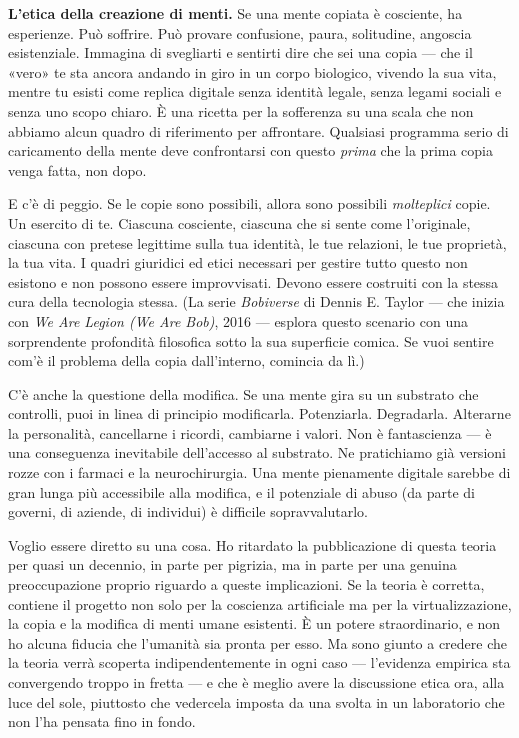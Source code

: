 \documentclass[11pt, twoside, openright]{book}
\begin{document}
\textbf{L'etica della creazione di menti.} Se una mente copiata è cosciente, ha esperienze. Può soffrire. Può provare confusione, paura, solitudine, angoscia esistenziale. Immagina di svegliarti e sentirti dire che sei una copia --- che il «vero» te sta ancora andando in giro in un corpo biologico, vivendo la sua vita, mentre tu esisti come replica digitale senza identità legale, senza legami sociali e senza uno scopo chiaro. È una ricetta per la sofferenza su una scala che non abbiamo alcun quadro di riferimento per affrontare. Qualsiasi programma serio di caricamento della mente deve confrontarsi con questo \textit{prima} che la prima copia venga fatta, non dopo.

E c'è di peggio. Se le copie sono possibili, allora sono possibili \textit{molteplici} copie. Un esercito di te. Ciascuna cosciente, ciascuna che si sente come l'originale, ciascuna con pretese legittime sulla tua identità, le tue relazioni, le tue proprietà, la tua vita. I quadri giuridici ed etici necessari per gestire tutto questo non esistono e non possono essere improvvisati. Devono essere costruiti con la stessa cura della tecnologia stessa. (La serie \textit{Bobiverse} di Dennis E. Taylor --- che inizia con \textit{We Are Legion (We Are Bob)}, 2016 --- esplora questo scenario con una sorprendente profondità filosofica sotto la sua superficie comica. Se vuoi sentire com'è il problema della copia dall'interno, comincia da lì.)

C'è anche la questione della modifica. Se una mente gira su un substrato che controlli, puoi in linea di principio modificarla. Potenziarla. Degradarla. Alterarne la personalità, cancellarne i ricordi, cambiarne i valori. Non è fantascienza --- è una conseguenza inevitabile dell'accesso al substrato. Ne pratichiamo già versioni rozze con i farmaci e la neurochirurgia. Una mente pienamente digitale sarebbe di gran lunga più accessibile alla modifica, e il potenziale di abuso (da parte di governi, di aziende, di individui) è difficile sopravvalutarlo.

Voglio essere diretto su una cosa. Ho ritardato la pubblicazione di questa teoria per quasi un decennio, in parte per pigrizia, ma in parte per una genuina preoccupazione proprio riguardo a queste implicazioni. Se la teoria è corretta, contiene il progetto non solo per la coscienza artificiale ma per la virtualizzazione, la copia e la modifica di menti umane esistenti. È un potere straordinario, e non ho alcuna fiducia che l'umanità sia pronta per esso. Ma sono giunto a credere che la teoria verrà scoperta indipendentemente in ogni caso --- l'evidenza empirica sta convergendo troppo in fretta --- e che è meglio avere la discussione etica ora, alla luce del sole, piuttosto che vedercela imposta da una svolta in un laboratorio che non l'ha pensata fino in fondo.
\end{document}
